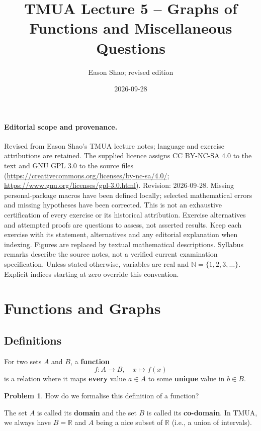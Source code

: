 \documentclass[11pt]{article}
\title{TMUA Lecture 5 -- Graphs of Functions and Miscellaneous Questions}
\author{Eason Shao; revised edition}
\date{2026-09-28}
\theoremstyle{definition}
\newtheorem{problem}[theorem]{Problem}
\theoremstyle{remark}
\newcommand{\pqty}[1]{\left(#1\right)}
\newcommand{\function}[5]{#1:#2\to #3,\quad #4\mapsto #5}
\newcommand{\NN}{\mathbb{N}}
\newcommand{\RR}{\mathbb{R}}
\begin{document}
\maketitle
\paragraph{Editorial scope and provenance.}
Revised from Eason Shao's TMUA lecture notes; language and exercise attributions are retained.
The supplied licence assigns CC BY-NC-SA 4.0 to the text and GNU GPL 3.0 to the source files
(\url{https://creativecommons.org/licenses/by-nc-sa/4.0/};
\url{https://www.gnu.org/licenses/gpl-3.0.html}).
Revision: 2026-09-28. Missing personal-package macros have been defined locally;
selected mathematical errors and missing hypotheses have been corrected.
This is not an exhaustive certification of every exercise or its historical attribution.
Exercise alternatives and attempted proofs are questions to assess, not asserted results.
Keep each exercise with its statement, alternatives and any editorial explanation when indexing.
Figures are replaced by textual mathematical descriptions. Syllabus remarks describe the
source notes, not a verified current examination specification.
Unless stated otherwise, variables are real and \(\NN=\{1,2,3,\ldots\}\).
Explicit indices starting at zero override this convention.

\tableofcontents


\section{Functions and Graphs}\label{tmua-5-section-001}
\subsection{Definitions}\label{tmua-5-subsection-001}

For two sets \(A\) and \(B\), a \textbf{function}
\[
    \function{f}{A}{B}{x}{f\pqty{x}}
\]
is a relation where it maps \textbf{every} value \(a \in A\) to some \textbf{unique} value in \(b \in B\).

\begin{problem}\label{tmua-5-unit-001}
    How do we formalise this definition of a function?
\end{problem}

The set \(A\) is called its \textbf{domain} and the set \(B\) is called its \textbf{co-domain}. In TMUA, we always have \(B = \RR\) and \(A\) being a nice subset of \(\RR\) (i.e., a union of intervals).
\end{document}
